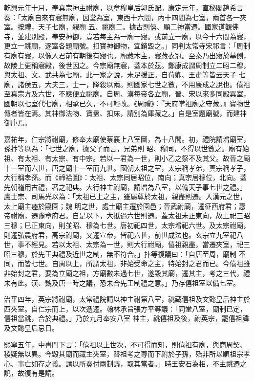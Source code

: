 \begin{pinyinscope}
 乾興元年十月，奉真宗神主祔廟，以章穆皇后郭氏配。康定元年，直秘閣趙希言奏：「太廟自來有寢無廟，因堂為室，東西十六間，內十四間為七室，兩首各一夾室。按禮，天子七廟，親廟
 五、祧廟二。據古則僖、順二神當遷。國家道觀佛寺，並建別殿，奉安神御，豈若每主為一廟一寢。或前立一廟，以今十六間為寢，更立一祧廟，逐室各題廟號。扣寶神御物，宜銷毀之。」同判太常寺宋祁言：「周制有廟有寢，以像人君前有朝後有寢也。廟藏木主，寢藏衣冠。至秦乃出寢於墓側，故陵上更稱寢殿，後世因之。今宗廟無寢，蓋本於茲。鄭康成謂周制立二昭二穆，與太祖、文、武共為七廟，此一家之說，未足援正。自荀卿、王肅等皆云天子
 七廟，諸侯五，大夫三，士一，降殺以兩。則國家七世之數，不用康成之說也。僖祖至真宗方及六世，不應便立祧廟。自周、漢每帝各立廟，晉、宋以來多同殿異室，國朝以七室代七廟，相承已久，不可輕改。《周禮》：『天府掌祖廟之守藏。』寶物世傳者皆在焉。其神御法物、寶盝、扣床，請別為庫藏之。」自是室題廟號，而建神御庫焉。



 嘉祐年，仁宗將祔廟，修奉太廟使蔡襄上八室圖，為十八間。初，禮院請增廟室，孫抃等以為：「七世之廟，據父子而言，兄弟則
 昭、穆同，不得以世數之。廟有始祖、有太祖、有太宗、有中宗。若以一君為一世，則小乙之祭不及其父。故晉之廟十一室而六世，唐之廟十一室而九世。國朝太祖之室，太宗稱孝弟，真宗稱孝子，大行稱孝孫。而《禘袷圖》：太祖、太宗同居昭位，南向；真宗居穆位，北向。蓋先朝稽用古禮，著之祀典。大行神主祔廟，請增為八室，以備天子事七世之禮。」盧士宗、司馬光以為：「太祖已上之主，雖屬尊於太祖，親盡則遷。入漢元之世，太上廟主瘞於寢園；魏
 明之世，處士廟主遷於園邑；晉武祔廟，遷征西府君；惠帝祔廟，遷豫章府君。自是以下，大抵過六世則遷。蓋太祖未正東向，故上祀三昭三穆；巳正東向，則並昭、穆為七世。唐初祀四世，太宗增祀六世。及太宗祔廟，則遷弘農府君，高宗祔廟，又遷宣帝，皆祀六世，前世成法也。玄宗立九室祀八世，事不經見。若以太祖、太宗為一世，則大行祔廟，僖祖親盡，當遷夾室，祀三昭三穆，於先王典禮及近世之制，無不符合。」抃等復議曰：「自唐至周，廟制
 不同，而皆七世。自周以上，所謂太祖，非始受命之主，特始封之君而已。今僖祖雖非始封之君，要為立廟之祖，方廟數未過七世，遂毀其廟，遷其主，考之三代，禮未有此。漢、魏及唐一時之議，恐未合先王制禮之意。」乃存僖祖室以備七室。



 治平四年，英宗將祔廟，太常禮院請以神主祔第八室，祧藏僖祖及文懿皇后神主於西夾室。自仁宗而上，以次遞遷。翰林承旨張方平等議：「同堂八室，廟制已定，僖祖當祧，合於典禮。」乃於九月奉安八室
 神主，祧僖祖及後，祔英宗，罷僖祖諱及文懿皇后忌日。



 熙寧五年，中書門下言：「僖祖以上世次，不可得而知，則僖祖有廟，與商周契、稷疑無以異。今毀其廟而藏主夾室，替祖考之尊而下祔於子孫，殆非所以順祖宗孝心、事亡如存之義。請以所奏付兩制議，取其當者。」時王安石為相，不主祧遷之說，故復有是請。




\end{pinyinscope}
